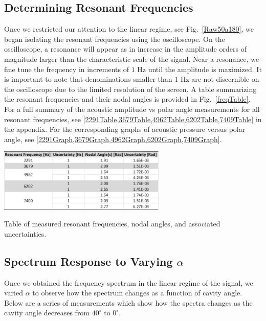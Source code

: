 \documentclass[12pt]{article}
\renewcommand{\deg}{^\circ} %
\newcommand{\figref}[1]{Fig.\ \ref{#1}}
\begin{document}
	\subsection{Determining Resonant Frequencies}
	Once we restricted our attention to the linear regime, see \figref{Raw50a180}, we began isolating the resonant frequencies using the oscilloscope. On the oscilloscope, a resonance will appear as in increase in the amplitude orders of magnitude larger than the characteristic scale of the signal. Near a resonance, we fine tune the frequency in increments of $1$ Hz until the amplitude is maximized. It is important to note that denominations smaller than $1$ Hz are not discernible on the oscilloscope due to the limited resolution of the screen. A table summarizing the resonant frequencies and their nodal angles is provided in \figref{freqTable}. For a full summary of the acoustic amplitude vs polar angle measurements for all resonant frequencies, see \cref{2291Table,3679Table,4962Table,6202Table,7409Table} in the appendix. For the corresponding graphs of acoustic pressure versus polar angle, see \cref{2291Graph,3679Graph,4962Graph,6202Graph,7409Graph}.
	
	\begin{table}[H]
		\captionsetup{justification = centering}
		\centering
		\includegraphics[width=0.6\textwidth]{Tables/ResTable.png}
		\caption{Table of measured resonant frequencies, nodal angles, and associated uncertainties.}
		\label{freqTable}
	\end{table}

	\subsection{Spectrum Response to Varying $\alpha$}
	Once we obtained the frequency spectrum in the linear regime of the signal, we varied $\alpha$ to observe how the spectrum changes as a function of cavity angle. Below are a series of measurements which show how the spectra changes as the cavity angle decreases from $40\deg$ to $0\deg$.
	
\end{document}

